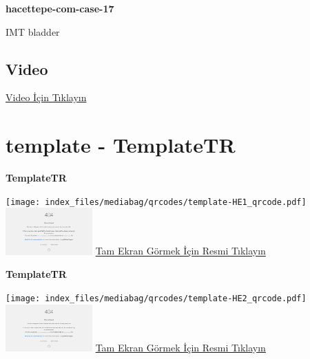 \documentclass[
  letterpaper,
  DIV=11,
  numbers=noendperiod]{scrreprt}
\begin{document}
\textbf{hacettepe-com-case-17}

\begin{tcolorbox}[enhanced jigsaw, breakable, opacitybacktitle=0.6, arc=.35mm, colbacktitle=quarto-callout-tip-color!10!white, colback=white, toptitle=1mm, left=2mm, opacityback=0, colframe=quarto-callout-tip-color-frame, titlerule=0mm, rightrule=.15mm, bottomrule=.15mm, toprule=.15mm, bottomtitle=1mm, title=\textcolor{quarto-callout-tip-color}{\faLightbulb}\hspace{0.5em}{Tanı}, coltitle=black, leftrule=.75mm]

IMT bladder

\end{tcolorbox}

\hypertarget{video-16}{%
\subsection{Video}\label{video-16}}

\href{https://www.youtube.com/watch?v=zlewGuN0BBY}{Video İçin Tıklayın}

\hypertarget{sec-template}{%
\section{template - TemplateTR}\label{sec-template}}

\textbf{TemplateTR}

\texttt{[image: index\_files/mediabag/qrcodes/template-HE1\_qrcode.pdf]}
\href{https://images.patolojiatlasi.com/template/HE1.html}{\includegraphics[width=0.25\textwidth,height=\textheight]{./screenshots/thumbnail_template-HE1.png}}
\href{https://images.patolojiatlasi.com/template/HE1.html}{Tam Ekran
Görmek İçin Resmi Tıklayın}

\textbf{TemplateTR}

\texttt{[image: index\_files/mediabag/qrcodes/template-HE2\_qrcode.pdf]}
\href{https://images.patolojiatlasi.com/template/HE2.html}{\includegraphics[width=0.25\textwidth,height=\textheight]{./screenshots/thumbnail_template-HE2.png}}
\href{https://images.patolojiatlasi.com/template/HE2.html}{Tam Ekran
Görmek İçin Resmi Tıklayın}
\end{document}
